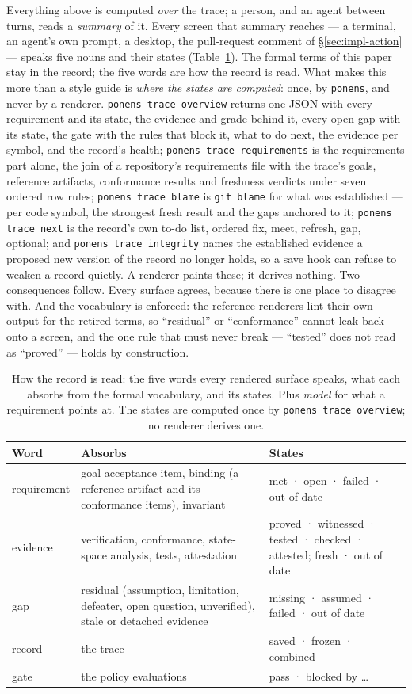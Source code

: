 \documentclass[11pt]{article}
\newcommand{\codeus}{\textunderscore\penalty100\relax}
\newcommand{\code}[1]{\texttt{\let\_\codeus #1}}
\begin{document}
Everything above is computed \emph{over} the trace; a person, and an agent between turns, reads a
\emph{summary} of it. Every screen that summary reaches --- a terminal, an agent's own prompt, a desktop,
the pull-request comment of \S\ref{sec:impl-action} --- speaks five nouns and their states
(Table~\ref{tab:five-words}). The formal terms of this paper stay in the record; the five words are how the
record is read. What makes this more than a style guide is \emph{where the states are computed}: once, by
\code{ponens}, and never by a renderer. \code{ponens trace overview} returns one JSON with every requirement
and its state, the evidence and grade behind it, every open gap with its state, the gate with the rules that
block it, what to do next, the evidence per symbol, and the record's health; \code{ponens trace
requirements} is the requirements part alone, the join of a repository's requirements file with the trace's
goals, reference artifacts, conformance results and freshness verdicts under seven ordered row rules;
\code{ponens trace blame} is \code{git blame} for what was established --- per code symbol, the strongest
fresh result and the gaps anchored to it; \code{ponens trace next} is the record's own to-do list, ordered
fix, meet, refresh, gap, optional; and \code{ponens trace integrity} names the established evidence a
proposed new version of the record no longer holds, so a save hook can refuse to weaken a record quietly.
A renderer paints these; it derives nothing. Two consequences follow. Every surface agrees, because there
is one place to disagree with. And the vocabulary is enforced: the reference renderers lint their own output
for the retired terms, so ``residual'' or ``conformance'' cannot leak back onto a screen, and the one rule
that must never break --- ``tested'' does not read as ``proved'' --- holds by construction.

\begin{table}[h]
\centering
\small
\begin{tabularx}{\textwidth}{@{}lXp{4.8cm}@{}}
\toprule
Word & Absorbs & States \\
\midrule
requirement & goal acceptance item, binding (a reference artifact and its conformance items), invariant & met · open · failed · out of date \\
evidence & verification, conformance, state-space analysis, tests, attestation & proved · witnessed · tested · checked · attested; fresh · out of date \\
gap & residual (assumption, limitation, defeater, open question, unverified), stale or detached evidence & missing · assumed · failed · out of date \\
record & the trace & saved · frozen · combined \\
gate & the policy evaluations & pass · blocked by \ldots \\
\bottomrule
\end{tabularx}
\caption{How the record is read: the five words every rendered surface speaks, what each absorbs from the
formal vocabulary, and its states. Plus \emph{model} for what a requirement points at. The states are
computed once by \code{ponens trace overview}; no renderer derives one.}
\label{tab:five-words}
\end{table}
\end{document}
